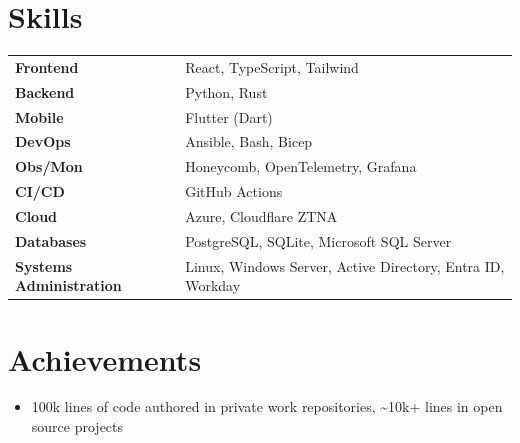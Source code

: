 \documentclass[11pt]{article}
\begin{document}
\section*{Skills}
\begin{tabular}{@{}p{}@{}p{}@{}}

\textbf{Frontend} & React, TypeScript, Tailwind \\

\textbf{Backend} & Python, Rust \\

\textbf{Mobile} & Flutter (Dart) \\

\textbf{DevOps} & Ansible, Bash, Bicep \\

\textbf{Obs/Mon} & Honeycomb, OpenTelemetry, Grafana \\

\textbf{CI/CD} & GitHub Actions \\

\textbf{Cloud} & Azure, Cloudflare ZTNA \\

\textbf{Databases} & PostgreSQL, SQLite, Microsoft SQL Server \\

\textbf{Systems Administration} & Linux, Windows Server, Active Directory, Entra ID, Workday \\

\end{tabular}

\section*{Achievements}

\begin{itemize}[leftmargin=*]
  
    \item 100k lines of code authored in private work repositories, \textasciitilde{}10k+ lines in open source projects
  
\end{itemize}
\end{document}
